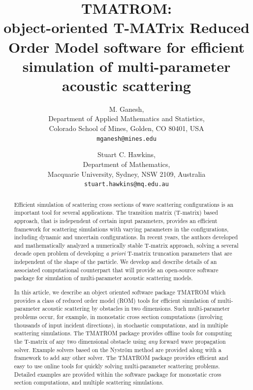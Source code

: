 \documentclass[12pt,letterpaper,final]{article}
\begin{document}
\title{{\bf TMATROM}:\\object-oriented  T-MATrix Reduced Order Model software
for efficient simulation of multi-parameter acoustic scattering}


\author{%
M. Ganesh,\\ Department of Applied Mathematics and Statistics,\\ Colorado School of Mines, Golden, CO 80401, USA \\
{\tt mganesh@mines.edu}
\and
Stuart C. Hawkins,\\ Department of Mathematics,\\Macquarie University, Sydney, NSW 2109, Australia \\
{\tt stuart.hawkins@mq.edu.au}}
\date{}

\maketitle

\vspace{-0.55in}
\begin{abstract}

\vspace{-0.2in}
Efficient simulation of scattering cross sections of wave scattering configurations
is an important tool for several applications. The transition matrix (T-matrix) based approach, that is 
independent of certain input parameters, provides an efficient framework for scattering simulations
with varying parameters in the configurations, including dynamic and uncertain configurations.  
In recent years, the authors developed and mathematically analyzed  a numerically stable T-matrix approach,
solving a several decade open problem of  developing {\em a priori} T-matrix truncation parameters that are 
independent of the shape of the particle. We develop and describe details of  an
associated computational counterpart that will provide an open-source software package for simulation of multi-parameter acoustic scattering models.


In this article, we describe an object oriented  software package TMATROM which provides a class of reduced order model (ROM) tools for efficient simulation of
multi-parameter acoustic scattering by obstacles in two dimensions.
Such multi-parameter problems occur, for example,  in monostatic cross section computations (involving
thousands of input incident directions),  in stochastic computations, and in multiple scattering simulations.
The TMATROM package provides offline tools for computing the T-matrix of
any two dimensional obstacle using {\em any} forward wave propagation solver.
Example solvers based on the Nystr\"om method are provided along with a framework to
add any other solver.  The TMATROM package provides efficient and easy to use online tools for 
quickly solving multi-parameter scattering problems.
Detailed examples are provided within the software package for monostatic cross section computations,
and multiple scattering simulations.
\end{abstract}
\end{document}
